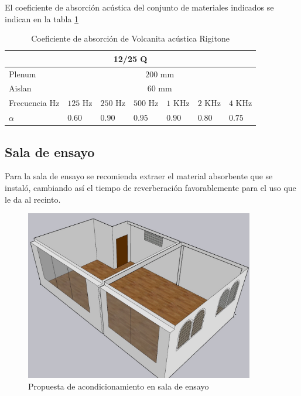 El coeficiente de absorción acústica del conjunto de materiales indicados se indican en la tabla \ref{tab: coef abs volcanita Rigitone}
\begin{table}[H]
    \centering
    \begin{tabular}{|lllllll|}
    \hline
    \multicolumn{7}{|c|}{\textbf{12/25 Q}} \\ \hline
    \multicolumn{1}{|l|}{Plenum} & \multicolumn{6}{c|}{$200$ mm} \\ \hline
    \multicolumn{1}{|l|}{Aislan} & \multicolumn{6}{c|}{$60$  mm} \\ \hline
    \multicolumn{1}{|l|}{Frecuencia Hz} & \multicolumn{1}{l|}{$125$ Hz} & \multicolumn{1}{l|}{$250$ Hz} & \multicolumn{1}{l|}{$500$ Hz} & \multicolumn{1}{l|}{$1$ KHz} & \multicolumn{1}{l|}{$2$ KHz} & $4$ KHz \\ \hline
    \multicolumn{1}{|l|}{$\alpha$} & \multicolumn{1}{l|}{$0.60$} & \multicolumn{1}{l|}{$0.90$} & \multicolumn{1}{l|}{$0.95$} & \multicolumn{1}{l|}{$0.90$} & \multicolumn{1}{l|}{$0.80$} & $0.75$ \\ \hline
    \end{tabular}
    \caption{Coeficiente de absorción de Volcanita acústica Rigitone}
    \label{tab: coef abs volcanita Rigitone}
\end{table}  

\subsection{Sala de ensayo}
Para la sala de ensayo se recomienda extraer el material absorbente que se instaló, cambiando así el tiempo de reverberación favorablemente para el uso que le da al recinto.
\begin{figure}[H]
    \centering
    \includegraphics[width=10cm]{Imagenes/Propuesta/Sala ensayo sin paneles.jpg}
    \caption{Propuesta de acondicionamiento en sala de ensayo}
    \label{fig:propuesta_ensayo}
\end{figure}